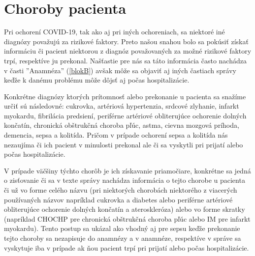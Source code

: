 \section{Choroby pacienta}
\label{choroby}
Pri ochorení COVID-19, tak ako aj pri iných ochoreniach, sa niektoré iné diagnózy považujú za rizikové faktory. Preto našou snahou bolo sa pokúsiť získať informáciu či pacient niektorou z diagnóz považovaných za možné rizikové faktory trpí, respektíve ju prekonal. Našťastie pre nás sa táto informácia často nachádza v časti ''Anamnéza'' (\ref{blokB}) avšak môže sa objaviť aj iných častiach správy keďže k danému problému môže dôjsť aj počas hospitalizácie.

Konkrétne diagnózy ktorých prítomnosť alebo prekonanie u pacienta sa snažíme určiť sú následovné: cukrovka, artériová hypertenzia, srdcové zlyhanie, infarkt myokardu, fibrilácia predsiení, periférne artériové obliterujúce ochorenie dolných končatín, chronická obštrukčná choroba pľúc, astma, cievna mozgová príhoda, demencia, sepsa a kolitída. Pričom v prípade ochorení sepsa a kolitída nás nezaujíma či ich pacient v minulosti prekonal ale či sa vyskytli pri prijatí alebo počas hospitalizácie.

V prípade väčšiny týchto chorôb je ich získavanie priamočiare, konkrétne sa jedná o zisťovanie či sa v texte správy nachádza informácia o tejto chorobe u pacienta či už vo forme celého názvu (pri niektorých chorobách niektorého z viacerých používaných názvov napríklad cukrovka a diabetes alebo periférne artériové obliterujúce ochorenie dolných končatín a ateroskleróza) alebo vo forme skratky (napríklad CHOCHP pre chronická obštrukčná choroba pľúc alebo IM pre infarkt myokardu). Tento postup sa ukázal ako vhodný aj pre sepsu keďže prekonanie tejto choroby sa nezapisuje do anamnézy a v anamnéze, respektíve v správe sa vyskytuje iba v prípade ak ňou pacient trpí pri prijatí alebo počas hospitalizácie.

